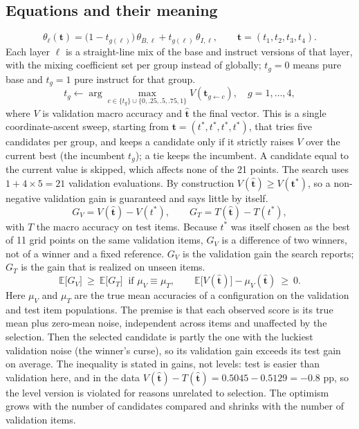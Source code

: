 \documentclass[conference]{IEEEtran}
\begin{document}
\subsection*{Equations and their meaning}
\begin{equation}
\theta_\ell(\mathbf t)=\big(1-t_{g(\ell)}\big)\,\theta_{B,\ell}+t_{g(\ell)}\,\theta_{I,\ell},\qquad \mathbf t=(t_1,t_2,t_3,t_4).
\end{equation}
Each layer $\ell$ is a straight-line mix of the base and instruct versions of that layer, with the mixing coefficient set per group instead of globally; $t_g=0$ means pure base and $t_g=1$ pure instruct for that group.
\begin{equation}
t_g\leftarrow\arg\max_{c\in\{t_g\}\cup\{0,.25,.5,.75,1\}}V(\mathbf t_{g\leftarrow c}),\quad g=1,\dots,4,
\end{equation}
where $V$ is validation macro accuracy and $\hat{\mathbf t}$ the final vector. This is a single coordinate-ascent sweep, starting from $\mathbf t=(t^*,t^*,t^*,t^*)$, that tries five candidates per group, and keeps a candidate only if it strictly raises $V$ over the current best (the incumbent $t_g$); a tie keeps the incumbent. A candidate equal to the current value is skipped, which affects none of the 21 points. The search uses $1+4\times5=21$ validation evaluations. By construction $V(\hat{\mathbf t})\ge V(\mathbf t^*)$, so a non-negative validation gain is guaranteed and says little by itself.
\begin{equation}
G_V=V(\hat{\mathbf t})-V(t^*),\qquad G_T=T(\hat{\mathbf t})-T(t^*),
\end{equation}
with $T$ the macro accuracy on test items. Because $t^*$ was itself chosen as the best of 11 grid points on the same validation items, $G_V$ is a difference of two winners, not of a winner and a fixed reference. $G_V$ is the validation gain the search reports; $G_T$ is the gain that is realized on unseen items.
\begin{equation}
\mathbb{E}\big[G_V\big]\ \ge\ \mathbb{E}\big[G_T\big]\ \text{ if } \mu_V\equiv\mu_T,\qquad
\mathbb{E}\big[V(\hat{\mathbf t})\big]-\mu_V(\hat{\mathbf t})\ \ge\ 0 .
\end{equation}
Here $\mu_V$ and $\mu_T$ are the true mean accuracies of a configuration on the validation and test item populations. The premise is that each observed score is its true mean plus zero-mean noise, independent across items and unaffected by the selection. Then the selected candidate is partly the one with the luckiest validation noise (the winner's curse), so its validation gain exceeds its test gain on average. The inequality is stated in gains, not levels: test is easier than validation here, and in the data $V(\hat{\mathbf t})-T(\hat{\mathbf t})=0.5045-0.5129=-0.8$ pp, so the level version is violated for reasons unrelated to selection. The optimism grows with the number of candidates compared and shrinks with the number of validation items.
\end{document}
